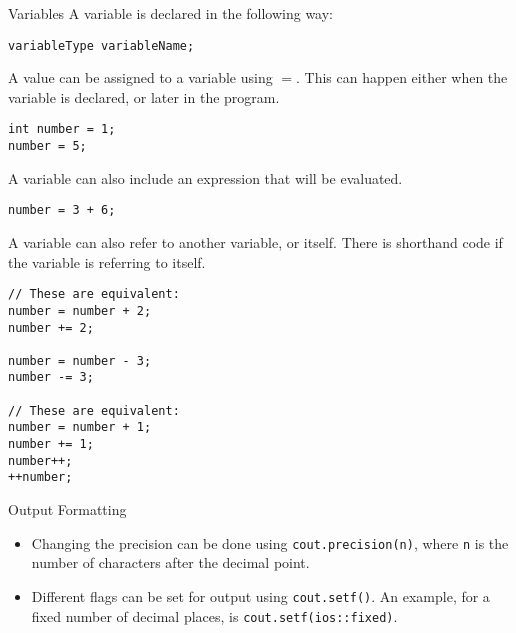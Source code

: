 \documentclass[\main/notes.tex]{subfiles}
\begin{document}
			\begin{definition}{Variables}
				A variable is declared in the following way:
				\begin{indentparagraph}
					\begin{verbatim}
variableType variableName;
					\end{verbatim}
				\end{indentparagraph}
				A value can be assigned to a variable using $=$. This can happen either when the variable is declared, or later in the program.
				\begin{indentparagraph}
					\begin{verbatim}
int number = 1;
number = 5;
					\end{verbatim}
				\end{indentparagraph}
				A variable can also include an expression that will be evaluated.
				\begin{indentparagraph}
					\begin{verbatim}
number = 3 + 6;
					\end{verbatim}
				\end{indentparagraph}
				A variable can also refer to another variable, or itself. There is shorthand code if the variable is referring to itself.
				\begin{indentparagraph}
					\begin{verbatim}
// These are equivalent:
number = number + 2;
number += 2;

number = number - 3;
number -= 3;

// These are equivalent:
number = number + 1;
number += 1;
number++;
++number;
					\end{verbatim}
				\end{indentparagraph}
			\end{definition}
			\begin{sidenote}{Output Formatting}
				\begin{itemize}[nosep]
					\item Changing the precision can be done using \texttt{cout.precision(n)}, where \texttt{n} is the number of characters after the decimal point.
					\item Different flags can be set for output using \texttt{cout.setf()}. An example, for a fixed number of decimal places, is \texttt{cout.setf(ios::fixed)}.
				\end{itemize}
			\end{sidenote}
\end{document}
